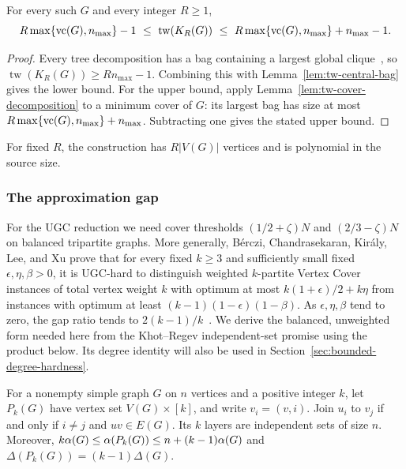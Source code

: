 \begin{lemma}\label{lem:tw-replication}
For every such $G$ and every integer $R\geq1$,
\[
 R\max\{\operatorname{vc}(G),n_{\max}\}-1
 \ \leq\ \operatorname{tw}(K_R(G))
 \ \leq\ R\max\{\operatorname{vc}(G),n_{\max}\}+n_{\max}-1.
\]
\end{lemma}


\begin{proof}
Every tree decomposition has a bag containing a largest global
clique~\cite[Lemma~4]{BonnetTreewidth}, so
$\operatorname{tw}(K_R(G))\geq Rn_{\max}-1$.
Combining this with Lemma~\ref{lem:tw-central-bag} gives the lower
bound. For the upper bound, apply
Lemma~\ref{lem:tw-cover-decomposition} to a minimum cover of $G$:
its largest bag has size at most
$R\max\{\operatorname{vc}(G),n_{\max}\}+n_{\max}$. Subtracting one gives the
stated upper bound.
\end{proof}

For fixed $R$, the construction has $R|V(G)|$ vertices and is
polynomial in the source size.

\subsubsection{The approximation gap}

For the \textup{UGC} reduction we need cover thresholds $(1/2+\zeta)N$ and
$(2/3-\zeta)N$ on balanced tripartite graphs. More generally,
B\'erczi, Chandrasekaran, Kir\'aly, Lee, and Xu prove that for every fixed $k\geq3$ and sufficiently
small fixed $\epsilon,\eta,\beta>0$, it is \textup{UGC}-hard to distinguish weighted $k$-partite
Vertex Cover instances of total vertex weight $k$ with optimum at most
$k(1+\epsilon)/2+k\eta$ from instances with optimum at least
$(k-1)(1-\epsilon)(1-\beta)$. As $\epsilon,\eta,\beta$ tend to zero,
the gap ratio tends to $2(k-1)/k$~\cite[Sections~3.5--3.6]{BCKLX2017}.
We derive the balanced, unweighted form needed here from the
Khot--Regev independent-set promise using the product below. Its degree
identity will also be used in
Section~\ref{sec:bounded-degree-hardness}.

\begin{lemma}\label{lem:multipartite-product}
For a nonempty simple graph $G$ on $n$ vertices and a positive integer
$k$, let $P_k(G)$ have vertex set $V(G)\times[k]$, and write
$v_i=(v,i)$. Join $u_i$ to $v_j$ if and only if $i\ne j$ and
$uv\in E(G)$. Its $k$ layers are independent
sets of size $n$. Moreover,
$k\alpha(G)\le\alpha(P_k(G))\le n+(k-1)\alpha(G)$ and
$\Delta(P_k(G))=(k-1)\Delta(G)$.
\end{lemma}

